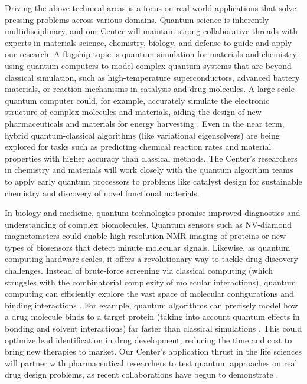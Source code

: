 \documentclass[12pt]{article}
\begin{document}
Driving the above technical areas is a focus on real-world applications that solve pressing problems across various domains. Quantum science is inherently multidisciplinary, and our Center will maintain strong collaborative threads with experts in materials science, chemistry, biology, and defense to guide and apply our research. A flagship topic is quantum simulation for materials and chemistry: using quantum computers to model complex quantum systems that are beyond classical simulation, such as high-temperature superconductors, advanced battery materials, or reaction mechanisms in catalysis and drug molecules. A large-scale quantum computer could, for example, accurately simulate the electronic structure of complex molecules and materials, aiding the design of new pharmaceuticals and materials for energy harvesting . Even in the near term, hybrid quantum-classical algorithms (like variational eigensolvers) are being explored for tasks such as predicting chemical reaction rates and material properties with higher accuracy than classical methods. The Center’s researchers in chemistry and materials will work closely with the quantum algorithm teams to apply early quantum processors to problems like catalyst design for sustainable chemistry and discovery of novel functional materials.



In biology and medicine, quantum technologies promise improved diagnostics and understanding of complex biomolecules. Quantum sensors such as NV-diamond magnetometers could enable high-resolution NMR imaging of proteins or new types of biosensors that detect minute molecular signals. Likewise, as quantum computing hardware scales, it offers a revolutionary way to tackle drug discovery challenges. Instead of brute-force screening via classical computing (which struggles with the combinatorial complexity of molecular interactions), quantum computing can efficiently explore the vast space of molecular configurations and binding interactions . For example, quantum algorithms can precisely model how a drug molecule binds to a target protein (taking into account quantum effects in bonding and solvent interactions) far faster than classical simulations . This could optimize lead identification in drug development, reducing the time and cost to bring new therapies to market. Our Center’s application thrust in the life sciences will partner with pharmaceutical researchers to test quantum approaches on real drug design problems, as recent collaborations have begun to demonstrate .
\end{document}
